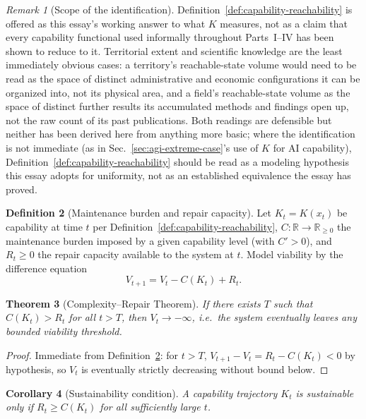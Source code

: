 \documentclass[11pt,a4paper]{article}
\theoremstyle{plain}
\newtheorem{theorem}{Theorem}[section]
\newtheorem{corollary}[theorem]{Corollary}
\theoremstyle{definition}
\newtheorem{definition}[theorem]{Definition}
\theoremstyle{remark}
\newtheorem{remark}[theorem]{Remark}
\begin{document}
\begin{remark}[Scope of the identification]
\label{rem:what-is-k}
Definition~\ref{def:capability-reachability} is offered as this essay's working answer to what $K$ measures, not as a claim that every capability functional used informally throughout Parts~I--IV has been shown to reduce to it. Territorial extent and scientific knowledge are the least immediately obvious cases: a territory's reachable-state volume would need to be read as the space of distinct administrative and economic configurations it can be organized into, not its physical area, and a field's reachable-state volume as the space of distinct further results its accumulated methods and findings open up, not the raw count of its past publications. Both readings are defensible but neither has been derived here from anything more basic; where the identification is not immediate (as in Sec.~\ref{sec:agi-extreme-case}'s use of $K$ for AI capability), Definition~\ref{def:capability-reachability} should be read as a modeling hypothesis this essay adopts for uniformity, not as an established equivalence the essay has proved.
\end{remark}

\begin{definition}[Maintenance burden and repair capacity]
\label{def:maintenance-repair}
Let $K_t = K(x_t)$ be capability at time $t$ per Definition~\ref{def:capability-reachability}, $C: \mathbb{R} \to \mathbb{R}_{\ge0}$ the maintenance burden imposed by a given capability level (with $C' > 0$), and $R_t \ge 0$ the repair capacity available to the system at $t$. Model viability by the difference equation
\[
V_{t+1} = V_t - C(K_t) + R_t.
\]
\end{definition}

\begin{theorem}[Complexity--Repair Theorem]
\label{thm:complexity-repair}
If there exists $T$ such that $C(K_t) > R_t$ for all $t > T$, then $V_t \to -\infty$, i.e.\ the system eventually leaves any bounded viability threshold.
\end{theorem}

\begin{proof}
Immediate from Definition~\ref{def:maintenance-repair}: for $t>T$, $V_{t+1}-V_t = R_t - C(K_t) < 0$ by hypothesis, so $V_t$ is eventually strictly decreasing without bound below.
\end{proof}

\begin{corollary}[Sustainability condition]
\label{cor:sustainability}
A capability trajectory $K_t$ is sustainable only if $R_t \ge C(K_t)$ for all sufficiently large $t$.
\end{corollary}
\end{document}

